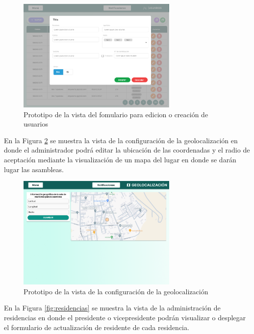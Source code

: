 \begin{figure}[H]
    \centering
    \includegraphics[width=0.7\textwidth]{resources/images/usuarios formulario}
    \caption{Prototipo de la vista del fomulario para edicion o creación de usuarios}
    \label{fig:usuarios formulario}
\end{figure}

En la Figura \ref{fig:geolocalizacion} se muestra la vista de la configuración de la geolocalización en donde el administrador podrá editar la ubicación de las coordenadas y el radio de aceptación mediante la visualización de un mapa del lugar en donde se darán lugar las asambleas.

\begin{figure}[H]
    \centering
    \includegraphics[width=0.7\textwidth]{resources/images/geolocalizacion}
    \caption{Prototipo de la vista de la configuración de la geolocalización}
    \label{fig:geolocalizacion}
\end{figure}

En la Figura \ref{fig:residencias} se muestra la vista de la administración de residencias en donde el presidente o vicepresidente podrán visualizar o desplegar el formulario de actualización de residente de cada residencia.

